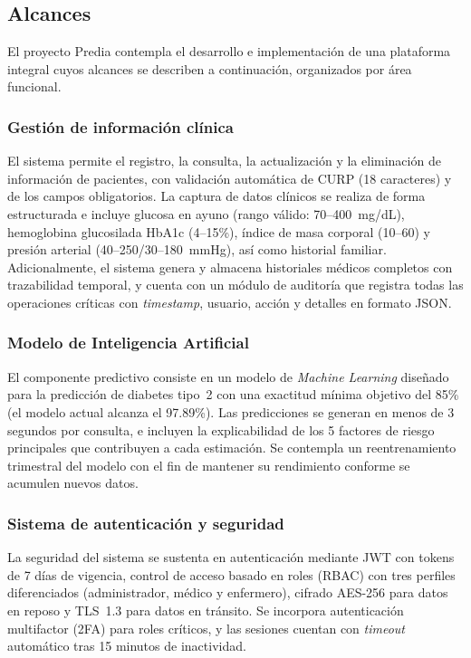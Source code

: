 \documentclass[12pt, letterpaper, twoside]{report}
\begin{document}
\subsection{Alcances}

El proyecto Predia contempla el desarrollo e implementación de una plataforma integral cuyos alcances se describen a continuación, organizados por área funcional.

\subsubsection{Gestión de información clínica}

El sistema permite el registro, la consulta, la actualización y la eliminación de información de pacientes, con validación automática de CURP (18 caracteres) y de los campos obligatorios. La captura de datos clínicos se realiza de forma estructurada e incluye glucosa en ayuno (rango válido: 70--400~mg/dL), hemoglobina glucosilada HbA1c (4--15\%), índice de masa corporal (10--60) y presión arterial (40--250/30--180~mmHg), así como historial familiar. Adicionalmente, el sistema genera y almacena historiales médicos completos con trazabilidad temporal, y cuenta con un módulo de auditoría que registra todas las operaciones críticas con \textit{timestamp}, usuario, acción y detalles en formato JSON.

\subsubsection{Modelo de Inteligencia Artificial}

El componente predictivo consiste en un modelo de \textit{Machine Learning} diseñado para la predicción de diabetes tipo~2 con una exactitud mínima objetivo del 85\% (el modelo actual alcanza el 97.89\%). Las predicciones se generan en menos de 3 segundos por consulta, e incluyen la explicabilidad de los 5 factores de riesgo principales que contribuyen a cada estimación. Se contempla un reentrenamiento trimestral del modelo con el fin de mantener su rendimiento conforme se acumulen nuevos datos.

\subsubsection{Sistema de autenticación y seguridad}

La seguridad del sistema se sustenta en autenticación mediante JWT con tokens de 7 días de vigencia, control de acceso basado en roles (RBAC) con tres perfiles diferenciados (administrador, médico y enfermero), cifrado AES-256 para datos en reposo y TLS~1.3 para datos en tránsito. Se incorpora autenticación multifactor (2FA) para roles críticos, y las sesiones cuentan con \textit{timeout} automático tras 15 minutos de inactividad.
\end{document}
